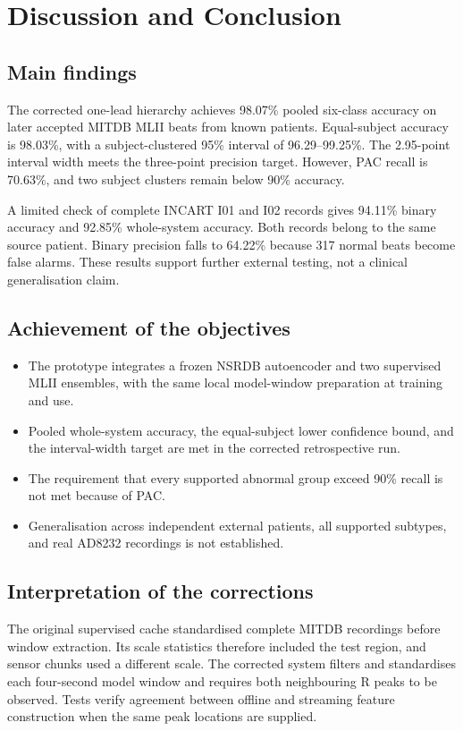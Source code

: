 \chapter{Discussion and Conclusion}\label{ch:conclusion}

\section{Main findings}
The corrected one-lead hierarchy achieves 98.07\% pooled six-class accuracy
on later accepted MITDB MLII beats from known patients. Equal-subject
accuracy is 98.03\%, with a subject-clustered 95\% interval of
96.29--99.25\%. The 2.95-point interval width meets the three-point
precision target. However, PAC recall is 70.63\%, and two subject clusters
remain below 90\% accuracy.

A limited check of complete INCART I01 and I02 records gives 94.11\%
binary accuracy and 92.85\% whole-system accuracy. Both records belong to
the same source patient. Binary precision falls to 64.22\% because 317
normal beats become false alarms. These results support further external
testing, not a clinical generalisation claim.

\section{Achievement of the objectives}
\begin{itemize}
\item The prototype integrates a frozen NSRDB autoencoder and two supervised
MLII ensembles, with the same local model-window preparation at training and use.
\item Pooled whole-system accuracy, the equal-subject lower confidence bound,
and the interval-width target are met in the corrected retrospective run.
\item The requirement that every supported abnormal group exceed 90\% recall
is not met because of PAC.
\item Generalisation across independent external patients, all supported
subtypes, and real AD8232 recordings is not established.
\end{itemize}

\section{Interpretation of the corrections}
The original supervised cache standardised complete MITDB recordings before
window extraction. Its scale statistics therefore included the test region,
and sensor chunks used a different scale. The corrected system filters and
standardises each four-second model window and requires both neighbouring
R peaks to be observed. Tests verify agreement between offline and streaming
feature construction when the same peak locations are supplied.

